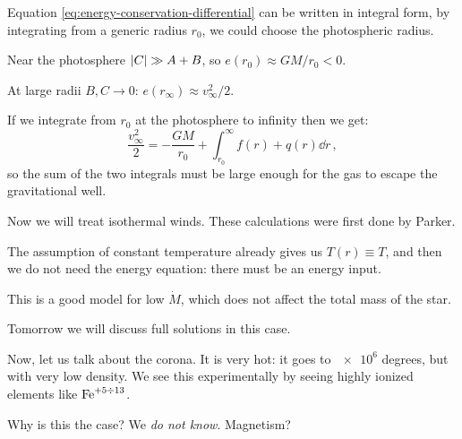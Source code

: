 \documentclass[main.tex]{subfiles}
\begin{document}

Equation \eqref{eq:energy-conservation-differential} can be written in integral form, by integrating from a generic radius \(r_0 \), we could choose the photospheric radius. 

Near the photosphere \(\abs{C} \gg A+B\), so  \(e(r_0 ) \approx GM / r_0 < 0 \).

At large radii \(B, C \to 0\): \(e(r_{\infty}) \approx v_{\infty}^2 /2\).

If we integrate from \(r_0 \) at the photosphere to infinity then we get: 
%
\begin{equation}
  \frac{v^2_{\infty}}{2} = - \frac{GM}{r_0 } + \int _{r_0 }^{\infty} f(r) + q(r) \dd{r} 
\,,
\end{equation}
%
so the sum of the two integrals must be large enough for the gas to escape the gravitational well.


Now we will treat isothermal winds. 
These calculations were first done by Parker.

The assumption of constant temperature already gives us \(T(r) \equiv T\), and then we do not need the energy equation: there must be an energy input.


This is a good model for low \(\dot{M} \), which does not affect the total mass of the star.

Tomorrow we will discuss full solutions in this case.

Now, let us talk about the corona.
It is very hot: it goes to \(\num{e6}\) degrees,  but with very low density.
We see this experimentally by seeing highly ionized 
elements like \(\ce{Fe}^{+5 \divisionsymbol 13}\).

Why is this the case? We \emph{do not know}. Magnetism?
\end{document}
